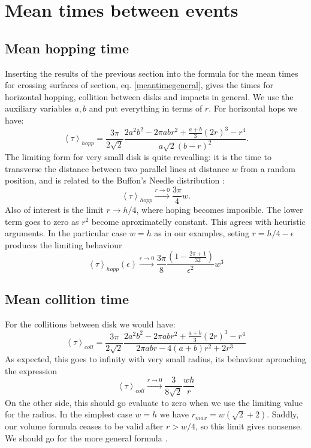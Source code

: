 \documentclass[a4paper,10pt, jcp, aps, preprint]{revtex4-1}
\newcommand{\mean}[1]{\left \langle #1 \right \rangle}
\begin{document}
\section{Mean times between events}

\subsection{Mean hopping time}

Inserting the results of the previous section 
into the formula for the mean times for crossing
surfaces of section, eq. \ref{meantimegeneral}, gives the times for 
horizontal hopping, 
collition between disks and impacts in general. We use the auxiliary
variables $a,b$ and put everything in terms of $r$. For horizontal
hops we have:
\begin{equation}\label{hoptau}
 \mean{\tau}_{hopp} = 	
\frac{3 \pi}{2\sqrt{2}}
\frac{2 a^{2} b^{2}  - 2 \pi a b r^{2} + \textstyle \frac{a+b}{3}  (2r)^{3}  -  r^4}
{ a \sqrt{2}  ( b - r )^2}.
\end{equation}
The limiting form for very small disk is quite revealling: it is the time
to transverse the distance between two parallel lines at distance $w$ from
a random position, and is related to the Buffon's Needle distribution 
\cite{EScheinerman}:
\begin{equation}\label{hoptaulimit}
 \mean{\tau}_{hopp} \xrightarrow{r\rightarrow 0} 	
\frac{3 \pi}{4}w.
\end{equation}
Also of interest is the limit $r\rightarrow h/4$, where hoping becomes
imposible. The lower term goes to zero as $r^2$ become aproximatelly constant.
This agrees with heuristic arguments. 
In the particular case $w=h$ as in our examples,
seting $r=h/4-\epsilon$ produces the limiting behaviour 
\begin{equation}
 \mean{\tau}_{hopp}(\epsilon) \xrightarrow{\epsilon\rightarrow 0} 	
\frac{3 \pi}{8}
\frac{(1-\frac{2\pi+1}{32})}
{ \epsilon^2} w^3
\end{equation} 

\subsection{Mean collition time}

For the collitions between disk we would have:
\begin{equation}\label{colltau}
 \mean{\tau}_{coll} = 	
\frac{3 \pi}{2\sqrt{2}}
\frac {2 a^{2} b^{2}  - 2 \pi a b r^{2} + \textstyle \frac{a+b}{3}  (2r)^{3}  -  r^4}
{2\pi a b r -4(a+b)r^2+2r^3}
\end{equation}
As expected, this goes to infinity with very small radius, its behaviour
aproaching the expression
\begin{equation}\label{colltaulim0}
\mean{\tau}_{coll}  \xrightarrow{r\rightarrow 0} 
\frac{3}{8\sqrt{2}}\frac{wh}{r}
\end{equation}
On the other side, this should go evaluate to zero when
we use the limiting value for the radius. In the simplest
case  $w = h$ we have $r_{max}= w(\sqrt{2}+2)$. Saddly, our volume
formula ceases to be valid after $r>w/4$, so this limit gives nonsense.
We should go for the more general formula \cite{notascalculokarel}.
\end{document}
